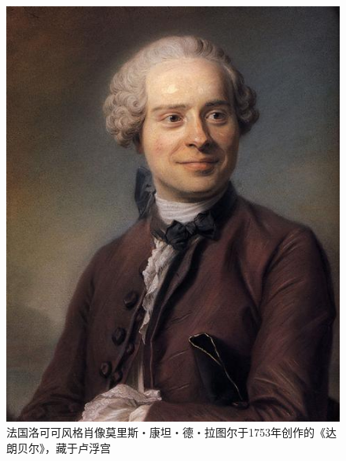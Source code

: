 \documentclass[b5paper]{ctexart}
\begin{document}
\begin{figure}[htbp]
  \centering
  \includegraphics[scale=0.33]{img/d-alembert}
  \caption{法国洛可可风格肖像莫里斯・康坦・德・拉图尔于1753年创作的《达朗贝尔》，藏于卢浮宫}
 \label{fig:dalembert}
\end{figure}
\end{document}
